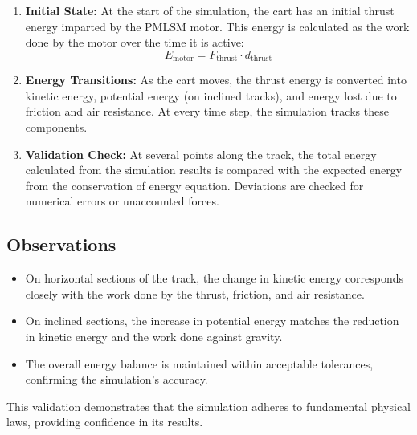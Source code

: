 \documentclass{article}
\begin{document}
    \begin{enumerate}
        \item \textbf{Initial State:} At the start of the simulation, the cart has
            an initial thrust energy imparted by the PMLSM motor. This energy is
            calculated as the work done by the motor over the time it is active:
            \begin{equation}
                E_{\text{motor}}= F_{\text{thrust}}\cdot d_{\text{thrust}}
            \end{equation}

        \item \textbf{Energy Transitions:} As the cart moves, the thrust energy is
            converted into kinetic energy, potential energy (on inclined tracks),
            and energy lost due to friction and air resistance. At every time
            step, the simulation tracks these components.

        \item \textbf{Validation Check:} At several points along the track, the total
            energy calculated from the simulation results is compared with the expected
            energy from the conservation of energy equation. Deviations are
            checked for numerical errors or unaccounted forces.
    \end{enumerate}

    \subsection{Observations}
    \begin{itemize}
        \item On horizontal sections of the track, the change in kinetic energy
            corresponds closely with the work done by the thrust, friction, and
            air resistance.

        \item On inclined sections, the increase in potential energy matches the
            reduction in kinetic energy and the work done against gravity.

        \item The overall energy balance is maintained within acceptable tolerances,
            confirming the simulation's accuracy.
    \end{itemize}

    This validation demonstrates that the simulation adheres to fundamental physical
    laws, providing confidence in its results.
\end{document}
